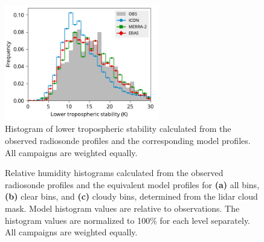 \documentclass[draft]{agujournal2019}
\begin{document}
\begin{figure}[t]
\centering
\includegraphics[width=0.6\textwidth]{img/rs_lts_hist.pdf}
\caption{
Histogram of lower tropospheric stability calculated from the observed radiosonde profiles and the corresponding model profiles. All campaigns are weighted equally.
}
\label{fig:rs-lts-hist}
\end{figure}

\begin{figure}[t]
\centering
{}
\caption{
Relative humidity histograms calculated from the observed radiosonde profiles and the equivalent model profiles for \textbf{(a)} all bins, \textbf{(b)} clear bins, and \textbf{(c)} cloudy bins, determined from the lidar cloud mask. Model histogram values are relative to observations. The histogram values are normalized to 100\% for each level separately. All campaigns are weighted equally.
}
\label{fig:rs-hur-hist}
\end{figure}
\end{document}
